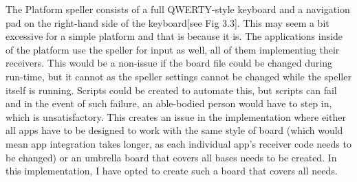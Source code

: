 The Platform speller consists of a full QWERTY-style keyboard and a navigation pad on the right-hand side of the keyboard[see Fig 3.3]. This may seem a bit excessive for a simple platform and that is because it is. The applications inside of the platform use the speller for input as well, all of them implementing their receivers. This would be a non-issue if the board file could be changed during run-time, but it cannot as the speller settings cannot be changed while the speller itself is running. Scripts could be created to automate this, but scripts can fail and in the event of such failure, an able-bodied person would have to step in, which is unsatisfactory. This creates an issue in the implementation where either all apps have to be designed to work with the same style of board (which would mean app integration takes longer, as each individual app's receiver code needs to be changed) or an umbrella board that covers all bases needs to be created. In this implementation, I have opted to create such a board that covers all needs.


